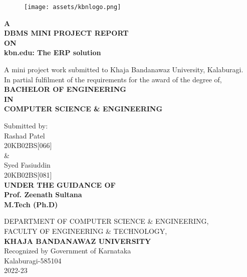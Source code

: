 \begin{center}

    \begin{figure}[h]
        \begin{center}
            \texttt{[image: assets/kbnlogo.png]}
        \end{center}
    \end{figure}

    \vfill
    \textbf{A\\ DBMS MINI PROJECT REPORT\\ ON\\
            kbn.edu: The ERP solution\\}

    \vfill
    A mini project work submitted to Khaja Bandanawaz University, Kalaburagi.\\
    In partial fulfilment of the requirements for the award of the degree of,\\

    \vfill
    \textcolor{RawSienna}{
        \textbf{BACHELOR OF ENGINEERING\\ IN\\
            COMPUTER SCIENCE \& ENGINEERING\\}
    }

    \vfill
    Submitted by:\\
    Rashad Patel\\
    20KB02BS[066]\\
    \&\\
    Syed Fasiuddin\\
    20KB02BS[081]\\

    \vfill
    \textcolor{RawSienna}{
    \textbf{UNDER THE GUIDANCE OF\\
            Prof. Zeenath Sultana\\
              \hskip 0.8in \footnotesize M.Tech (Ph.D)\\}
    }

    \vfill
    DEPARTMENT OF COMPUTER SCIENCE \& ENGINEERING,\\
    FACULTY OF ENGINEERING \& TECHNOLOGY,\\

    \vfill
    \textbf{KHAJA BANDANAWAZ UNIVERSITY}\\
    Recognized by Government of Karnataka\\
    Kalaburagi-585104\\
    2022-23

\end{center}
